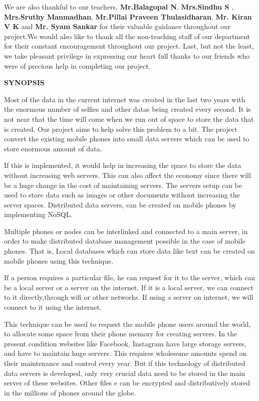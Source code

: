\documentclass[12pt, a4paper]{article}
\begin{document}
\hspace{5mm}We are also thankful to our teachers, \textbf{Mr.Balagopal N}, \textbf{Mrs.Sindhu S },  \textbf{Mrs.Sruthy Manmadhan}, \textbf{Mr.Pillai Praveen Thulasidharan}, \textbf{Mr. Kiran V K }and \textbf{Mr. Syam Sankar}  for their valuable guidance throughout our project.We would also like to thank all the non-teaching staff of our department for their constant encouragement throughout our project. Last, but not the least, we take pleasant privilege in expressing our heart full thanks to our friends who were of precious help in completing our project.
\newpage


\begin{center}
{\huge \bfseries SYNOPSIS} \\[3cm]
\end{center}
Most of the data in the current internet was created in the last two years with the enormous number of selfies and other datas being created every second. It is not near that the time will come when we run out of space to store the data that is created. Our project aims to help solve this problem to a bit. The project  convert the existing mobile phones into small data servers which can be used to store enormous amount of data.

\hspace{5mm}If this is implemented,  it would help in increasing the space to store the data without increasing web servers.  This can also affect the economy since there will be a huge change in the cost of maintaining servers. The servers setup can be used to store data such as images or other documents without increasing the server spaces. Distributed data servers, can be created on mobile phones by implementing NoSQL. 

\hspace{5mm}Multiple phones or nodes can be interlinked and connected to a main server, in order to make distributed database management possible in the case of mobile phones. That is, Local databases which can store data like text can be created on mobile phones using this technique. 

\hspace{5mm}If a person requires a particular file, he can request for it to the server, which can be a local server or a server on the internet. If it is a local server, we can connect to it directly,through wifi or other networks. If using a server on internet, we will connect to it using the internet. 

\hspace{5mm}This technique can be used to request the mobile phone users around the world, to allocate some space from their phone memory for creating servers. In the present condition websites like Facebook, Instagram have large storage servers, and have to maintain huge servers. This requires wholesome amounts spend on their maintenance and control every year. But if this technology of distributed data servers is developed, only very crucial data need to be stored in the main server of these websites. Other files e can be encrypted and distributively stored in the millions of phones around the globe.
\end{document}
